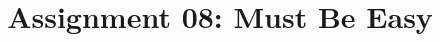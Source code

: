 \documentclass{article}
\title{Assignment 08: Must Be Easy}
\begin{document}
\renderTitle
\end{document}
